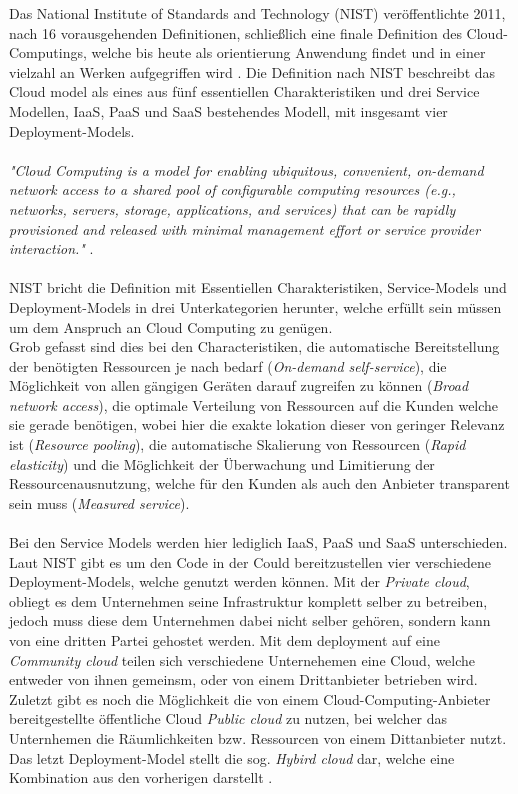 \documentclass[11pt]{article}
\begin{document}
Das National Institute of Standards and Technology (NIST) veröffentlichte 2011, nach 16 vorausgehenden Definitionen, schließlich eine finale Definition des Cloud-Computings, welche bis heute als orientierung Anwendung findet und in einer vielzahl an Werken aufgegriffen wird \cite{mell2011nist}. Die Definition nach NIST beschreibt das Cloud model als eines aus fünf essentiellen Charakteristiken und drei Service Modellen, IaaS, PaaS und SaaS bestehendes Modell, mit insgesamt vier Deployment-Models. \\\\
\textit{"Cloud Computing is a model for enabling ubiquitous, convenient, on-demand network access to a shared pool of configurable computing resources (e.g., networks, servers, storage, applications, and services) that can be rapidly provisioned and released with minimal management effort or service provider interaction."} \cite{mell2011nist}.\\\\
NIST bricht die Definition mit Essentiellen Charakteristiken, Service-Models und Deployment-Models in drei Unterkategorien herunter, welche erfüllt sein müssen um dem Anspruch an Cloud Computing zu genügen. \\
Grob gefasst sind dies bei den Characteristiken, die automatische Bereitstellung der benötigten Ressourcen je nach bedarf (\textit{On-demand self-service}), die Möglichkeit von allen gängigen Geräten darauf zugreifen zu können (\textit{Broad network access}), die optimale Verteilung von Ressourcen auf die Kunden welche sie gerade benötigen, wobei hier die exakte lokation dieser von geringer Relevanz ist (\textit{Resource pooling}), die automatische Skalierung von Ressourcen (\textit{Rapid elasticity}) und die Möglichkeit der Überwachung und Limitierung der Ressourcenausnutzung, welche für den Kunden als auch den Anbieter transparent sein muss (\textit{Measured service}).\\\\
Bei den Service Models werden hier lediglich IaaS, PaaS und SaaS unterschieden. Laut NIST gibt es um den Code in der Could bereitzustellen vier verschiedene Deployment-Models, welche genutzt werden können. Mit der \textit{Private cloud}, obliegt es dem Unternehmen seine Infrastruktur komplett selber zu betreiben, jedoch muss diese dem Unternehmen dabei nicht selber gehören, sondern kann von eine dritten Partei gehostet werden. Mit dem deployment auf eine \textit{Community cloud} teilen sich verschiedene Unternehemen eine Cloud, welche entweder von ihnen gemeinsm, oder von einem Drittanbieter betrieben wird. Zuletzt gibt es noch die Möglichkeit die von einem Cloud-Computing-Anbieter bereitgestellte öffentliche Cloud \textit{Public cloud} zu nutzen, bei welcher das Unternhemen die Räumlichkeiten bzw. Ressourcen von einem Dittanbieter nutzt. Das letzt Deployment-Model stellt die sog. \textit{Hybird cloud} dar, welche eine Kombination aus den vorherigen darstellt \cite{mell2011nist}.
\end{document}
